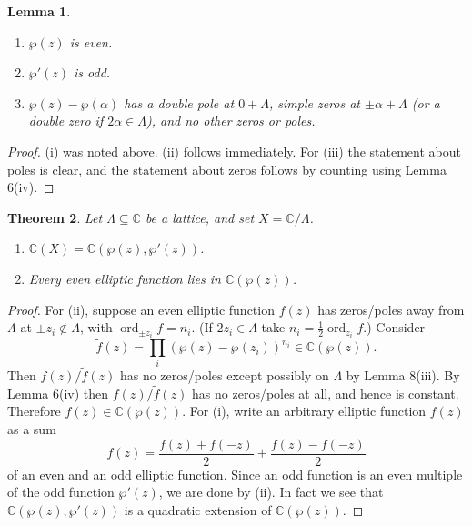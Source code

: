 \documentclass[a4paper]{article}
\theoremstyle{plain}
\newtheorem{theorem}{Theorem}
\newtheorem{lemma}[theorem]{Lemma}
\theoremstyle{remark}
\theoremstyle{definition}
\DeclareMathOperator{\ord}{ord}
\newcommand{\C}{\mathbb{C}}
\begin{document}
\begin{lemma}
    ~
    \begin{enumerate}[label=(\roman*)]
        \item $\wp(z)$ is even.
        \item $\wp'(z)$ is odd.
        \item $\wp(z)-\wp(\alpha)$ has a double pole at $0+\Lambda$, simple
            zeros at $\pm\alpha+\Lambda$ (or a double zero if
            $2\alpha\in\Lambda$), and no other zeros or poles.
    \end{enumerate}
\end{lemma}

\begin{proof}
    (i) was noted above. (ii) follows immediately. For (iii) the statement about
    poles is clear, and the statement about zeros follows by counting using
    Lemma 6(iv).
\end{proof}

\begin{theorem}
    Let $\Lambda\subseteq\C$ be a lattice, and set $X=\C/\Lambda$.
    \begin{enumerate}[label=(\roman*)]
        \item $\C(X)=\C(\wp(z),\wp'(z))$.
        \item Every even elliptic function lies in $\C(\wp(z))$.
    \end{enumerate}
\end{theorem}

\begin{proof}
    For (ii), suppose an even elliptic function $f(z)$ has zeros/poles away from
    $\Lambda$ at $\pm z_i\notin\Lambda$, with $\ord_{\pm z_i}f=n_i$. (If
    $2z_i\in\Lambda$ take $n_i=\frac{1}{2}\ord_{z_i}f$.) Consider
    \begin{equation*}
        \tilde f(z)=\prod_i(\wp(z)-\wp(z_i))^{n_i} \in \C(\wp(z)).
    \end{equation*}
    Then $f(z)/\tilde f(z)$ has no zeros/poles except possibly on $\Lambda$ by
    Lemma 8(iii). By Lemma 6(iv) then $f(z)/\tilde f(z)$ has no zeros/poles at
    all, and hence is constant. Therefore $f(z)\in\C(\wp(z))$. For (i), write an
    arbitrary elliptic function $f(z)$ as a sum
    \begin{equation*}
        f(z) = \frac{f(z)+f(-z)}{2} + \frac{f(z)-f(-z)}{2}
    \end{equation*}
    of an even and an odd elliptic function. Since an odd function is an even
    multiple of the odd function $\wp'(z)$, we are done by (ii). In fact we see
    that $\C(\wp(z),\wp'(z))$ is a quadratic extension of $\C(\wp(z))$.
\end{proof}
\end{document}
